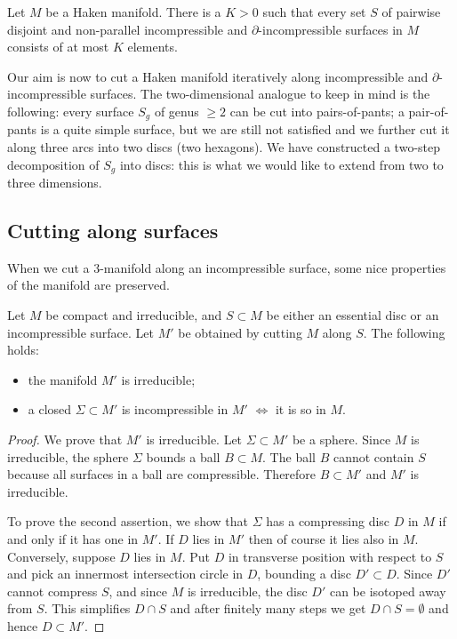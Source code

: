 \begin{cor} \label{incompressible:cor}
Let $M$ be a Haken manifold. There is a $K>0$ such that every set $S$ of pairwise disjoint and non-parallel incompressible and $\partial$-incompressible surfaces in $M$ consists of at most $K$ elements.
\end{cor}

Our aim is now to cut a Haken manifold iteratively along incompressible and $\partial$-incompressible surfaces. The two-dimensional analogue to keep in mind is the following: every surface $S_g$ of genus $\geqslant 2$ can be cut into pairs-of-pants; a pair-of-pants is a quite simple surface, but we are still not satisfied and we further cut it along three arcs into two discs (two hexagons). We have constructed a two-step decomposition of $S_g$ into discs: this is what we would like to extend from two to three dimensions.

\subsection{Cutting along surfaces}
When we cut a 3-manifold along an incompressible surface, some nice properties of the manifold are preserved.

\begin{prop} \label{cut:surface:prop}
Let $M$ be compact and irreducible, and $S\subset M$ be either an essential disc or an incompressible surface. Let $M'$ be obtained by cutting $M$ along $S$. The following holds:
\begin{itemize}
\item the manifold $M'$ is irreducible;
\item a closed $\Sigma\subset M'$ is incompressible in $M'$ $\Longleftrightarrow$ it is so in $M$.
\end{itemize}
\end{prop}
\begin{proof}
We prove that $M'$ is irreducible. Let $\Sigma\subset M'$ be a sphere. Since $M$ is irreducible, the sphere $\Sigma$ bounds a ball $B\subset M$. The ball $B$ cannot contain $S$ because all surfaces in a ball are compressible. Therefore $B\subset M'$ and $M'$ is irreducible.

To prove the second assertion, we show that $\Sigma$ has a compressing disc $D$ in $M$ if and only if it has one in $M'$. If $D$ lies in $M'$ then of course it lies also in $M$. Conversely, suppose $D$ lies in $M$. Put $D$ in transverse position with respect to $S$ and pick an innermost intersection circle in $D$, bounding a disc $D'\subset D$. Since $D'$ cannot compress $S$, and since $M$ is irreducible, the disc $D'$ can be isotoped away from $S$. This simplifies $D\cap S$ and after finitely many steps we get $D\cap S = \emptyset$ and hence $D\subset M'$.
\end{proof}

